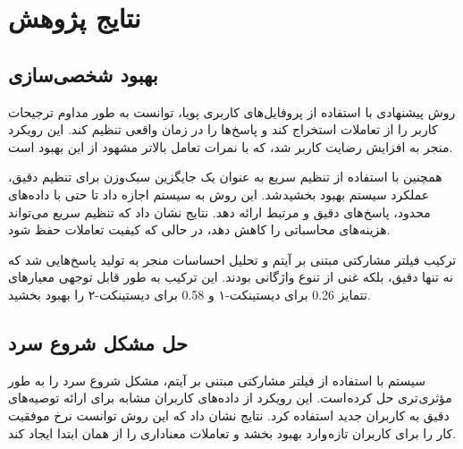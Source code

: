 \section{نتایج پژوهش}

\subsection{بهبود شخصی‌سازی}

روش پیشنهادی با استفاده از پروفایل‌های کاربری پویا، توانست به طور مداوم ترجیحات کاربر را از تعاملات استخراج کند و پاسخ‌ها را در زمان واقعی تنظیم کند. این رویکرد منجر به افزایش رضایت کاربر شد، که با نمرات تعامل بالاتر مشهود از این بهبود است.

همچنین با استفاده از تنظیم سریع به عنوان یک جایگزین سبک‌وزن برای تنظیم دقیق، عملکرد سیستم بهبود بخشید شد. این روش به سیستم اجازه داد تا حتی با داده‌های محدود، پاسخ‌های دقیق و مرتبط ارائه دهد. نتایج نشان داد که تنظیم سریع می‌تواند هزینه‌های محاسباتی را کاهش دهد، در حالی که کیفیت تعاملات حفظ شود.


ترکیب فیلتر مشارکتی مبتنی بر آیتم و تحلیل احساسات منجر به تولید پاسخ‌هایی شد که نه تنها دقیق، بلکه غنی از تنوع واژگانی بودند. این ترکیب به طور قابل توجهی معیارهای تتمایز
\num{0.26}
برای دیستینکت-۱ و 
\num{0.58}
 برای دیستینکت-۲ را بهبود بخشید.

\subsection{حل مشکل شروع سرد}

سیستم با استفاده از فیلتر مشارکتی مبتنی بر آیتم، مشکل شروع سرد را به طور مؤثری تری حل کرده است. این رویکرد از داده‌های کاربران مشابه برای ارائه توصیه‌های دقیق به کاربران جدید استفاده کرد. نتایج نشان داد که این روش توانست نرخ موفقیت کار را برای کاربران تازه وارد بهبود بخشد و تعاملات معناداری را از همان ابتدا ایجاد کند.

